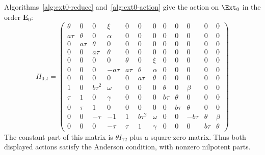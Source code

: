 Algorithms~\ref{alg:ext0-reduce} and~\ref{alg:ext0-action}
give the action on $\Ext_0$ in the order $\mathbf E_0$:
\begingroup
\setlength{\arraycolsep}{2pt}
\begin{equation}
 \Pi_{0,t}=
\begin{pmatrix}
  \theta & 0 & 0 & \xi & 0 & 0 & 0 & 0 & 0 & 0 & 0 & 0\\
  a\tau & \theta & 0 & \alpha & 0 & 0 & 0 & 0 & 0 & 0 & 0 & 0\\
  0 & a\tau & \theta & 0 & 0 & 0 & 0 & 0 & 0 & 0 & 0 & 0\\
  0 & 0 & a\tau & \theta & 0 & 0 & 0 & 0 & 0 & 0 & 0 & 0\\
  0 & 0 & 0 & 0 & \theta & 0 & \xi & 0 & 0 & 0 & 0 & 0\\
  0 & 0 & 0 & -a\tau & a\tau & \theta & \alpha & 0 & 0 & 0 & 0 & 0\\
  0 & 0 & 0 & 0 & 0 & a\tau & \theta & 0 & 0 & 0 & 0 & 0\\
  1 & 0 & b\tau^2 & \omega & 0 & 0 & 0 & \theta & 0 & \beta & 0 & 0\\
  \tau & 1 & 0 & \gamma & 0 & 0 & 0 & b\tau & \theta & 0 & 0 & 0\\
  0 & \tau & 1 & 0 & 0 & 0 & 0 & 0 & b\tau & \theta & 0 & 0\\
  0 & 0 & -\tau & -1 & 1 & b\tau^2 & \omega & 0 & 0 & -b\tau & \theta & \beta\\
  0 & 0 & 0 & -\tau & \tau & 1 & \gamma & 0 & 0 & 0 & b\tau & \theta
 \end{pmatrix}
 \label{eq:large-ext0-action}
\end{equation}
\endgroup
The constant part of this matrix is $\theta I_{12}$ plus
a square-zero matrix. Thus both displayed actions satisfy
the Anderson condition, with nonzero nilpotent parts.


